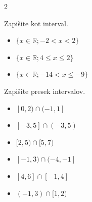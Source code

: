                 \begin{multicols}{2}
                    
        
            \begin{naloga}
                Zapišite kot interval.
                \begin{itemize}
                        \item $\{x\in\mathbb{R}; -2<x<2\}$ 
                        \item $\{x\in\mathbb{R}; 4\leq x\leq 2\}$ 
                        \item $\{x\in\mathbb{R}; -14<x\leq -9\}$ 
                \end{itemize}
            \end{naloga}
        


        
        


        
            \begin{naloga}
                Zapišite presek intervalov.
                \begin{itemize}
                    
                        \item $ [0,2)\cap(-1,1]$ 
                        \item $ [-3,5]\cap(-3,5)$ 
                        \item $ [2,5)\cap[5,7)$ 
                        \item $ [-1,3)\cap(-4,-1]$ 
                        \item $ [4,6]\cap[-1,4]$ 
                        \item $ (-1,3)\cap[1,2)$ 
                    

                \end{itemize}
            \end{naloga}
        



\end{multicols}
